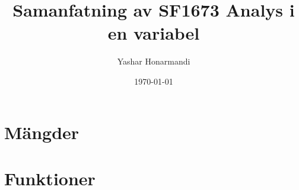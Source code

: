 \documentclass[a4paper, 11pt]{article}
\title{Samanfatning av SF1673 Analys i en variabel}
\author{Yashar Honarmandi}
\date{\today}
\begin{document}
\sloppy

\maketitle

\begin{abstract}
	
\end{abstract}

\thispagestyle{empty}

\newpage

\tableofcontents

\newpage


\twocolumn

\section{Mängder}



\section{Funktioner}




\end{document}
